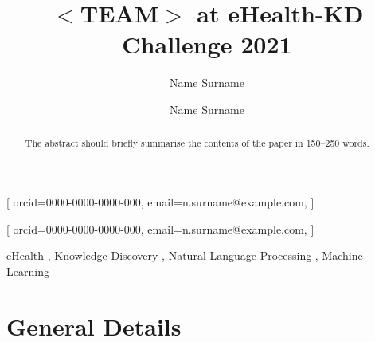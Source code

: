 \documentclass[
]{ceurart}
\begin{document}


\title{$<$TEAM$>$ at eHealth-KD Challenge 2021}


\author[1]{Name Surname}[%
orcid=0000-0000-0000-000,
email=n.surname@example.com,
]
\author[2,3]{Name Surname}[%
orcid=0000-0000-0000-000,
email=n.surname@example.com,
]

\address[1]{Institution A, City, Country}
\address[2]{Institution B, City, Country}
\address[3]{Institution C, City, Country}

\begin{abstract}
The abstract should briefly summarise the contents of the paper in 150--250 words.
\end{abstract}

\begin{keywords}
  eHealth \sep
  Knowledge Discovery \sep
  Natural Language Processing \sep
  Machine Learning
\end{keywords}

\maketitle

\pagestyle{plain}

\section*{General Details}
\end{document}
